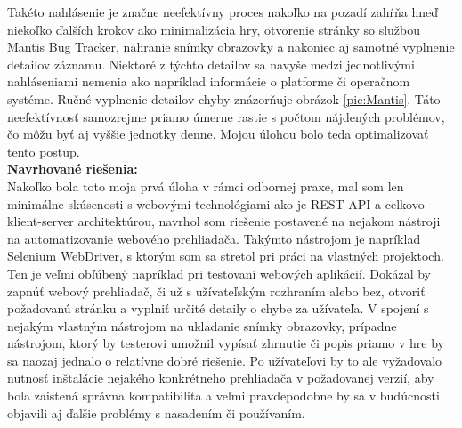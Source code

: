 \documentclass[slovak, bachelorpractice]{diploma}
\begin{document}
Takéto nahlásenie je značne neefektívny proces nakoľko na pozadí zahŕňa hneď niekoľko ďalších krokov ako minimalizácia hry, otvorenie stránky so službou Mantis Bug Tracker, nahranie snímky obrazovky a nakoniec aj samotné vyplnenie detailov záznamu. Niektoré z týchto detailov sa navyše medzi jednotlivými nahláseniami nemenia ako napríklad informácie o platforme či operačnom systéme. Ručné vyplnenie detailov chyby znázorňuje obrázok \ref{pic:Mantis}.
Táto neefektívnosť samozrejme priamo úmerne rastie s počtom nájdených problémov, čo môžu byť aj vyššie jednotky denne. Mojou úlohou bolo teda optimalizovať tento postup. \\
\textbf{Navrhované riešenia:} \\ Nakoľko bola toto moja prvá úloha v rámci odbornej praxe, mal som len minimálne skúsenosti s webovými technológiami ako je REST API a celkovo klient-server architektúrou, navrhol som riešenie postavené na nejakom nástroji na automatizovanie webového prehliadača. Takýmto nástrojom je napríklad Selenium WebDriver, s ktorým som sa stretol pri práci na vlastných projektoch. Ten je veľmi obľúbený napríklad pri testovaní webových aplikácií. Dokázal by zapnúť webový prehliadač, či už s užívateľským rozhraním alebo bez, otvoriť požadovanú stránku a vyplniť určité detaily o chybe za užívateľa. V spojení s nejakým vlastným nástrojom na ukladanie snímky obrazovky, prípadne nástrojom, ktorý by testerovi umožnil vypísať zhrnutie či popis priamo v hre by sa naozaj jednalo o relatívne dobré riešenie. Po užívateľovi by to ale vyžadovalo nutnosť inštalácie nejakého konkrétneho prehliadača v požadovanej verzií, aby bola zaistená správna kompatibilita a veľmi pravdepodobne by sa v budúcnosti objavili aj ďalšie problémy s nasadením či používaním. 
\end{document}
